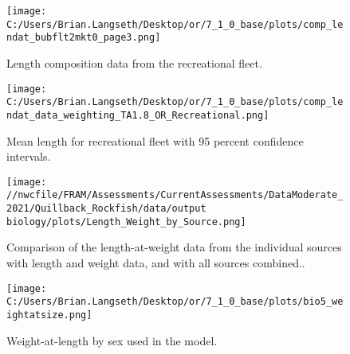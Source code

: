 \documentclass[11pt,
  english,
  a4paper,
]{article}
\begin{document}
\tagmcend\tagstructend


\begin{figure}
\centering
\texttt{[image: C:/Users/Brian.Langseth/Desktop/or/7\_1\_0\_base/plots/comp\_lendat\_bubflt2mkt0\_page3.png]}
\caption{Length composition data from the recreational fleet.\label{fig:rec-len-data}}
\end{figure}

\tagmcend\tagstructend


\begin{figure}
\centering
\texttt{[image: C:/Users/Brian.Langseth/Desktop/or/7\_1\_0\_base/plots/comp\_lendat\_data\_weighting\_TA1.8\_OR\_Recreational.png]}
\caption{Mean length for recreational fleet with 95 percent confidence intervals.\label{fig:mean-rec-len-data}}
\end{figure}

\tagmcend\tagstructend


\begin{figure}
\centering
\texttt{[image: //nwcfile/FRAM/Assessments/CurrentAssessments/DataModerate\_2021/Quillback\_Rockfish/data/output biology/plots/Length\_Weight\_by\_Source.png]}
\caption{Comparison of the length-at-weight data from the individual sources with length and weight data, and with all sources combined..\label{fig:len-weight-survey}}
\end{figure}

\tagmcend\tagstructend


\begin{figure}
\centering
\texttt{[image: C:/Users/Brian.Langseth/Desktop/or/7\_1\_0\_base/plots/bio5\_weightatsize.png]}
\caption{Weight-at-length by sex used in the model.\label{fig:len-weight}}
\end{figure}
\end{document}
